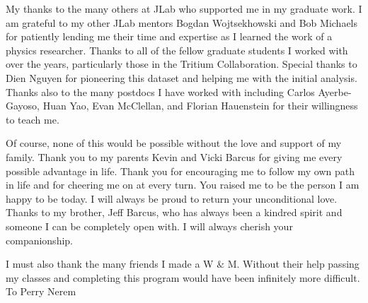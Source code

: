 \documentclass[../main.tex]{subfiles}
\begin{document}
\begin{singlespace}
{{\begin{flushleft}
My thanks to the many others at JLab who supported me in my graduate work. I am grateful to my other JLab mentors Bogdan Wojtsekhowski and Bob Michaels for patiently lending me their time and expertise as I learned the work of a physics researcher. Thanks to all of the fellow graduate students I worked with over the years, particularly those in the Tritium Collaboration. Special thanks to Dien Nguyen for pioneering this dataset and helping me with the initial analysis. Thanks also to the many postdocs I have worked with including Carlos                                                                      Ayerbe-Gayoso, Huan Yao, Evan McClellan, and Florian Hauenstein for their willingness to teach me.

\end{flushleft}
} %

{\parindent0pt %
\begin{flushleft}
                                                                                 
Of course, none of this would be possible without the love and support of my family. Thank you to my parents Kevin and Vicki Barcus for giving me every possible advantage in life. Thank you for encouraging me to follow my own path in life and for cheering me on at every turn. You raised me to be the person I am happy to be today. I will always be proud to return your unconditional love. Thanks to my brother, Jeff Barcus, who has always been a kindred spirit and someone I can be completely open with. I will always cherish your companionship.                                                                    

\end{flushleft}
} %

{\parindent0pt %
\begin{flushleft}
                                                                                 
I must also thank the many friends I made a W $\&$ M. Without their help passing my classes and completing this program would have been infinitely more difficult. To Perry Nerem                                                           

\end{flushleft}
} %

{\parindent0pt %
\begin{flushleft}
                                                                                 
                                                                

\end{flushleft}
} %

} %
\end{singlespace}
\end{document}
